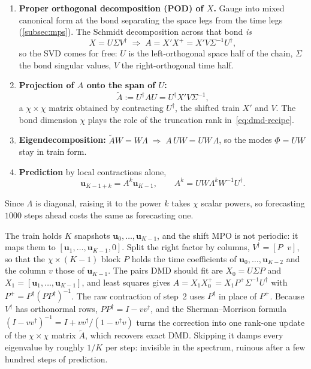 \begin{enumerate}
  \item \textbf{Proper orthogonal decomposition (POD) of $X$.} Gauge into mixed
    canonical form at the bond separating the space legs from the time legs
    (\cref{subsec:mps}). The Schmidt decomposition across that bond \emph{is}
    \begin{equation}
      X = U\Sigma V^{\dagger}
      \;\Longrightarrow\;
      A = X'X^{+} = X'V\Sigma^{-1}U^{\dagger},
      \label{eq:mps-pod}
    \end{equation}%
    so the SVD comes for free: $U$ is the left-orthogonal space half of the
    chain, $\Sigma$ the bond singular values, $V$ the right-orthogonal time half.
  \item \textbf{Projection of $A$ onto the span of $U$:}
    \begin{equation}
      \tilde{A} := U^{\dagger} A U = U^{\dagger} X' V \Sigma^{-1},
      \label{eq:mps-project}
    \end{equation}%
    a $\chi \times \chi$ matrix obtained by contracting $U^\dagger$, the shifted
    train $X'$ and $V$. The bond dimension $\chi$ plays the role of the
    truncation rank in~\eqref{eq:dmd-recipe}.
  \item \textbf{Eigendecomposition:}
    $\tilde{A}W = W\Lambda \;\Longrightarrow\; A\,UW = UW\,\Lambda$, so the
    modes $\Phi = UW$ stay in train form.
  \item \textbf{Prediction} by local contractions alone,
    \begin{equation}
      \mathbf u_{K-1+k} = A^k \mathbf u_{K-1}, \qquad
      A^k = U W \Lambda^k W^{-1} U^{\dagger} .
      \label{eq:mps-dmd-predict}
    \end{equation}%
\end{enumerate}
Since $\Lambda$ is diagonal, raising it to the power $k$ takes $\chi$ scalar
powers, so forecasting $1000$ steps ahead costs the same as forecasting one.

\begin{remark}
  The train holds $K$ snapshots $\mathbf u_0,\dots,\mathbf u_{K-1}$, and the
  shift MPO is not periodic: it maps them to
  $[\mathbf u_1,\dots,\mathbf u_{K-1},0]$. Split the right factor by columns,
  $V^\dagger = [P \;\; v]$, so that the $\chi\times(K-1)$ block $P$ holds the
  time coefficients of $\mathbf u_0,\dots,\mathbf u_{K-2}$ and the column $v$
  those of $\mathbf u_{K-1}$. The pairs DMD should fit are
  $X_0 = U\Sigma P$ and $X_1 = [\mathbf u_1,\dots,\mathbf u_{K-1}]$, and least
  squares gives $A = X_1X_0^{+} = X_1P^{+}\Sigma^{-1}U^\dagger$ with
  $P^{+} = P^\dagger(PP^\dagger)^{-1}$. The raw contraction of step~2 uses
  $P^\dagger$ in place of $P^{+}$. Because $V^\dagger$ has orthonormal rows,
  $PP^\dagger = I - vv^\dagger$, and the Sherman--Morrison formula
  $(I - vv^\dagger)^{-1} = I + vv^\dagger/(1 - v^\dagger v)$ turns the
  correction into one rank-one update of the $\chi\times\chi$ matrix
  $\tilde A$, which recovers exact DMD. Skipping it damps every eigenvalue by
  roughly $1/K$ per step: invisible in the spectrum, ruinous after a few hundred
  steps of prediction.
\end{remark}

